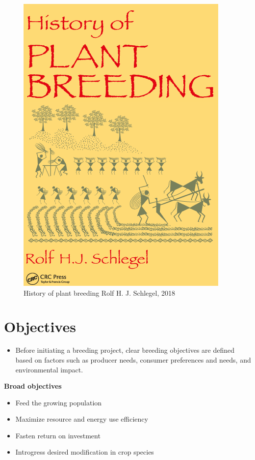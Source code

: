 \documentclass[11pt,ignorenonframetext,aspectratio=169]{beamer}
\providecommand{\tightlist}{%
  \setlength{\itemsep}{0pt}\setlength{\parskip}{0pt}}
\begin{document}
\begin{frame}{}
\protect\hypertarget{section-12}{}
\begin{figure}
\includegraphics[width=0.4\linewidth,height=0.7\textwidth, keepaspectratio]{./images/plant_breeding_history} \caption{History of plant breeding Rolf H. J. Schlegel, 2018}\label{fig:plb-history-book}
\end{figure}
\end{frame}

\hypertarget{objectives}{%
\section{Objectives}\label{objectives}}

\begin{frame}{}
\protect\hypertarget{section-13}{}
\small

\begin{itemize}
\tightlist
\item
  Before initiating a breeding project, clear breeding objectives are
  defined based on factors such as producer needs, consumer preferences
  and needs, and environmental impact.
\end{itemize}

\textbf{Broad objectives}

\begin{itemize}
\tightlist
\item
  Feed the growing population
\item
  Maximize resource and energy use efficiency
\item
  Fasten return on investment
\item
  Introgress desired modification in crop species
\end{itemize}
\end{frame}
\end{document}
